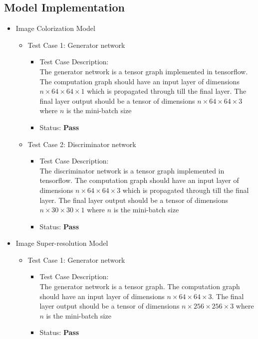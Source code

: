 \documentclass[oneside,a4paper,12pt]{report}
\begin{document}
\subsection{Model Implementation}
\begin{itemize}
	\item Image Colorization Model
	\begin{itemize}
		\item Test Case 1: Generator network
		\begin{itemize}
			\item Test Case Description:\\
			The generator network is a tensor graph implemented in tensorflow. The computation graph should have an input layer of dimensions $n \times 64 \times 64 \times 1$ which is propagated through till the final layer. The final layer output should be a tensor of dimensions $n \times 64 \times 64 \times 3$ where $n$ is the mini-batch size
			\item Status: \textbf{Pass}
		\end{itemize}
		\item Test Case 2: Discriminator network
		\begin{itemize}
			\item Test Case Description:\\
			The discriminator network is a tensor graph implemented in tensorflow. The computation graph should have an input layer of dimensions $n \times 64 \times 64 \times 3$ which is propagated through till the final layer. The final layer output should be a tensor of dimensions $n \times 30 \times 30 \times 1$ where $n$ is the mini-batch size
			\item Status: \textbf{Pass}
		\end{itemize}
	\end{itemize}
	\item Image Super-resolution Model
	\begin{itemize}
		\item Test Case 1: Generator network
		\begin{itemize}
			\item Test Case Description:\\
			The generator network is a tensor graph. The computation graph should have an input layer of dimensions $n \times 64 \times 64 \times 3$. The final layer output should be a tensor of dimensions $n \times 256 \times 256 \times 3$ where $n$ is the mini-batch size
			\item Status: \textbf{Pass}
		\end{itemize}

\end{itemize}
\end{itemize}
\end{document}
